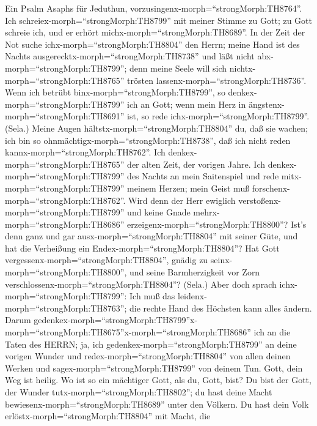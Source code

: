  Ein Psalm Asaphs für Jeduthun,
vorzusingenx-morph=``strongMorph:TH8764''. Ich
schreiex-morph=``strongMorph:TH8799'' mit meiner Stimme zu Gott; zu Gott
schreie ich, und er erhört michx-morph=``strongMorph:TH8689''.
 In der Zeit der Not suche ichx-morph=``strongMorph:TH8804''
den Herrn; meine Hand ist des Nachts
ausgerecktx-morph=``strongMorph:TH8738'' und läßt nicht
abx-morph=``strongMorph:TH8799''; denn meine Seele will sich
nichtx-morph=``strongMorph:TH8765'' trösten
lassenx-morph=``strongMorph:TH8736''.  Wenn ich betrübt
binx-morph=``strongMorph:TH8799'', so
denkex-morph=``strongMorph:TH8799'' ich an Gott; wenn mein Herz in
ängstenx-morph=``strongMorph:TH8691'' ist, so rede
ichx-morph=``strongMorph:TH8799''. (Sela.)  Meine Augen
hältstx-morph=``strongMorph:TH8804'' du, daß sie wachen; ich bin so
ohnmächtigx-morph=``strongMorph:TH8738'', daß ich nicht reden
kannx-morph=``strongMorph:TH8762''.  Ich
denkex-morph=``strongMorph:TH8765'' der alten Zeit, der vorigen Jahre.
 Ich denkex-morph=``strongMorph:TH8799'' des Nachts an mein
Saitenspiel und rede mitx-morph=``strongMorph:TH8799'' meinem Herzen;
mein Geist muß forschenx-morph=``strongMorph:TH8762''.  Wird
denn der Herr ewiglich verstoßenx-morph=``strongMorph:TH8799'' und keine
Gnade mehrx-morph=``strongMorph:TH8686''
erzeigenx-morph=``strongMorph:TH8800''?  Ist's denn ganz und
gar ausx-morph=``strongMorph:TH8804'' mit seiner Güte, und hat die
Verheißung ein Endex-morph=``strongMorph:TH8804''?  Hat Gott
vergessenx-morph=``strongMorph:TH8804'', gnädig zu
seinx-morph=``strongMorph:TH8800'', und seine Barmherzigkeit vor Zorn
verschlossenx-morph=``strongMorph:TH8804''? (Sela.)  Aber
doch sprach ichx-morph=``strongMorph:TH8799'': Ich muß das
leidenx-morph=``strongMorph:TH8763''; die rechte Hand des Höchsten kann
alles ändern.  Darum
gedenkex-morph=``strongMorph:TH8799''\textbar x-morph=``strongMorph:TH8675''x-morph=``strongMorph:TH8686''
ich an die Taten des HERRN; ja, ich
gedenkex-morph=``strongMorph:TH8799'' an deine vorigen Wunder
 und redex-morph=``strongMorph:TH8804'' von allen deinen
Werken und sagex-morph=``strongMorph:TH8799'' von deinem Tun.
 Gott, dein Weg ist heilig. Wo ist so ein mächtiger Gott,
als du, Gott, bist?  Du bist der Gott, der Wunder
tutx-morph=``strongMorph:TH8802''; du hast deine Macht
bewiesenx-morph=``strongMorph:TH8689'' unter den Völkern. 
Du hast dein Volk erlöstx-morph=``strongMorph:TH8804'' mit Macht, die
